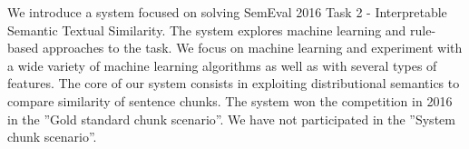 We introduce a system focused on solving SemEval 2016 Task 2 - Interpretable Semantic Textual Similarity. The system explores machine learning and rule-based approaches to the task. We focus on machine learning and experiment with a wide variety of machine learning algorithms as well as with several types of features. The core of our system consists in exploiting distributional semantics to compare similarity of sentence chunks. The system won the competition in 2016 in the ''Gold standard chunk scenario''. We have not participated in the ''System chunk scenario''.
